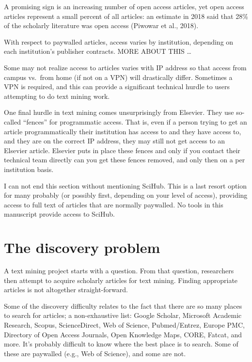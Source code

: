 \documentclass[author-year, review, 11pt]{components/elsarticle} %
\begin{document}
A promising sign is an increasing number of open access articles, yet
open access articles represent a small percent of all articles: an
estimate in 2018 said that 28\% of the scholarly literature was open
access (Piwowar et al., 2018).

With respect to paywalled articles, access varies by institution,
depending on each institution's publisher contracts. MORE ABOUT THIS
\ldots{}

Some may not realize access to articles varies with IP address so that
access from campus vs.~from home (if not on a VPN) will drastically
differ. Sometimes a VPN is required, and this can provide a significant
technical hurdle to users attempting to do text mining work.

One final hurdle in text mining comes unsurprisingly from Elsevier. They
use so-called ``fences'' for programmatic access. That is, even if a
person trying to get an article programmatically their institution has
access to and they have access to, and they are on the correct IP
address, they may still not get access to an Elsevier article. Elsevier
puts in place these fences and only if you contact their technical team
directly can you get these fences removed, and only then on a per
institution basis.

I can not end this section without mentioning SciHub. This is a last
resort option for many probably (or possibly first, depending on your
level of access), providing access to full text of articles that are
normally paywalled. No tools in this manuscript provide access to
SciHub.

\hypertarget{the-discovery-problem}{%
\section{The discovery problem}\label{the-discovery-problem}}

A text mining project starts with a question. From that question,
researchers then attempt to acquire scholarly articles for text mining.
Finding appropriate articles is not altogether straight-forward.

Some of the discovery difficulty relates to the fact that there are so
many places to search for articles; a non-exhaustive list: Google
Scholar, Microsoft Academic Research, Scopus, ScienceDirect, Web of
Science, Pubmed/Entrez, Europe PMC, Directory of Open Access Journals,
Open Knowledge Maps, CORE, Fatcat, and more. It's probably difficult to
know where the best place is to search. Some of these are paywalled
(e.g., Web of Science), and some are not.
\end{document}
